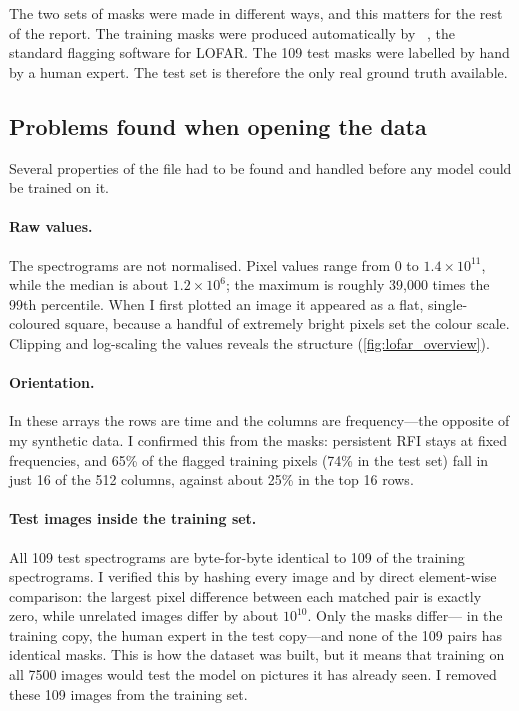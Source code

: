 The two sets of masks were made in different ways, and this matters for the
rest of the report. The training masks were produced automatically by
\aoflagger{}~\cite{offringa2012}, the standard flagging software for LOFAR.
The 109 test masks were labelled by hand by a human expert. The test set is
therefore the only real ground truth available.

\subsection{Problems found when opening the data}
\label{sec:lofar_audit}
Several properties of the file had to be found and handled before any model
could be trained on it.

\paragraph{Raw values.} The spectrograms are not normalised. Pixel values
range from 0 to $1.4\times10^{11}$, while the median is about $1.2\times10^{6}$;
the maximum is roughly 39{,}000 times the 99th percentile. When I first plotted
an image it appeared as a flat, single-coloured square, because a handful of
extremely bright pixels set the colour scale. Clipping and log-scaling the
values reveals the structure (\cref{fig:lofar_overview}).

\paragraph{Orientation.} In these arrays the rows are time and the columns are
frequency---the opposite of my synthetic data. I confirmed this from the masks:
persistent RFI stays at fixed frequencies, and 65\% of the flagged training
pixels (74\% in the test set) fall in just 16 of the 512 columns, against
about 25\% in the top 16 rows.

\paragraph{Test images inside the training set.} All 109 test spectrograms are
byte-for-byte identical to 109 of the training spectrograms. I verified this
by hashing every image and by direct element-wise comparison: the largest
pixel difference between each matched pair is exactly zero, while unrelated
images differ by about $10^{10}$. Only the masks differ---\aoflagger{} in the
training copy, the human expert in the test copy---and none of the 109 pairs
has identical masks. This is how the dataset was built, but it means that
training on all 7500 images would test the model on pictures it has already
seen. I removed these 109 images from the training set.

